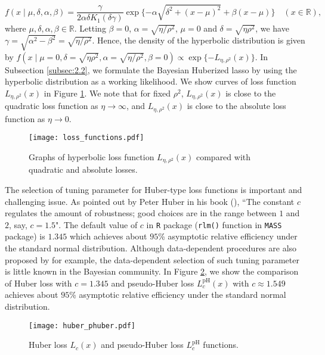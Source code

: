 \documentclass[11pt]{article}
\theoremstyle{plain}
\theoremstyle{definition}
\begin{document}
\[f(x\mid\mu , \delta , \alpha , \beta)=\dfrac{\gamma}{2\alpha\delta K_{1}(\delta{\gamma})}\exp\{-\alpha\sqrt{\delta^{2}+(x-\mu)^{2}}+\beta(x-\mu)\} \quad (x \in \mathbb{R}),\]
where $\mu,\delta,\alpha,\beta \in \mathbb{R}$. Letting $\beta=0$, $\alpha=\sqrt{\eta/\rho^2}$, $\mu=0$ and $\delta=\sqrt{\eta\rho^2}$, we have $\gamma=\sqrt{\alpha^2-\beta^2}=\sqrt{\eta/\rho^2}$. Hence, the density of the hyperbolic distribution is given by $f(x\mid\mu=0 , \delta=\sqrt{\eta\rho^2} , \alpha=\sqrt{\eta/\rho^2} , \beta=0) \propto \exp\{-L_{\eta,\rho^2}(x)\}$. In Subsection \ref{subsec:2.2}, we formulate the Bayesian Huberized lasso by using the hyperbolic distribution as a working likelihood. We show curves of loss function $L_{\eta,\rho^2}(x)$ in Figure \ref{loss_plot}. We note that for fixed $\rho^2$, $L_{\eta,\rho^2}(x)$ is close to the quadratic loss function as $\eta\to \infty$, and $L_{\eta,\rho^2}(x)$ is close to the absolute loss function as $\eta\to 0$.

\begin{figure}[htpb]
\centering
\texttt{[image: loss\_functions.pdf]}
\caption{Graphs of hyperbolic loss function $L_{\eta,\rho^2}(x)$ compared with quadratic and absolute losses.}
\label{loss_plot}
\end{figure}

The selection of tuning parameter for Huber-type loss functions is important and challenging issue. As pointed out by Peter Huber in his book (\cite{HR09}), ``The constant $c$ regulates the amount of robustness; good choices are in the range between $1$ and $2$, say, $c=1.5$". The default value of $c$ in {\tt R} package ({\tt rlm()} function in {\tt MASS} package) is $1.345$ which achieves about $95$\% asymptotic relative efficiency under the standard normal distribution. Although data-dependent procedures are also proposed by \cite{WLZB07} for example, the data-dependent selection of such tuning parameter is little known in the Bayesian community. In Figure \ref{huber_loss_plot}, we show the comparison of Huber loss with $c=1.345$ and pseudo-Huber loss $L_c^{\mathrm{pH}}(x)$ with $c\approx 1.549$ achieves about $95$\% asymptotic relative efficiency under the standard normal distribution.

\begin{figure}[htpb]
\centering
\texttt{[image: huber\_phuber.pdf]}
\caption{Huber loss $L_c(x)$ and pseudo-Huber loss $L_c^{\mathrm{pH}}$ functions.}
\label{huber_loss_plot}
\end{figure}
\end{document}
